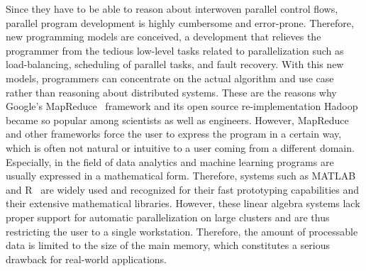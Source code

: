 Since they have to be able to reason about interwoven parallel control flows, parallel program development is highly cumbersome and error-prone.
Therefore, new programming models are conceived, a development that relieves the programmer from the tedious low-level tasks related to parallelization such as load-balancing, scheduling of parallel tasks, and fault recovery.
With this new models, programmers can concentrate on the actual algorithm and use case rather than reasoning about distributed systems. These are the reasons why Google's MapReduce~\cite{dean:c2008a} framework and its open source re-implementation Hadoop~\cite{hadoop:2008a} became so popular among scientists as well as engineers.
However, MapReduce and other frameworks force the user to express the program in a certain way, which is often not natural or intuitive to a user coming from a different domain.
Especially, in the field of data analytics and machine learning programs are usually expressed in a mathematical form.
Therefore, systems such as MATLAB~\cite{matlab} and R~\cite{r:1993a} are widely used and recognized for their fast prototyping capabilities and their extensive mathematical libraries.
However, these linear algebra systems lack proper support for automatic parallelization on large clusters and are thus restricting the user to a single workstation.
Therefore, the amount of processable data is limited to the size of the main memory, which constitutes a serious drawback for real-world applications.


